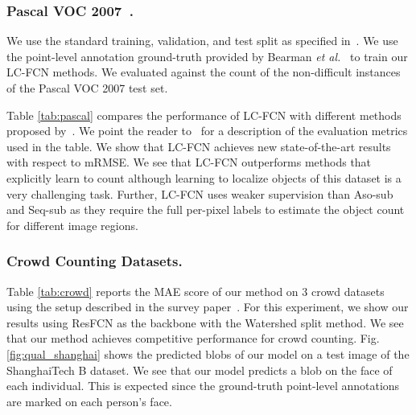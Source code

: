 \documentclass[runningheads]{llncs}
\begin{document}
\vspace{-.6cm}
\subsubsection{Pascal VOC 2007~\cite{everingham2015pascal}.}  We use the standard training, validation, and test split as specified in~\cite{everingham2015pascal}. We use the point-level annotation ground-truth provided by Bearman \emph{et al.}~\cite{bearman2016s} to train our LC-FCN methods. We evaluated against the count of the non-difficult instances of the Pascal VOC 2007 test set.





Table \ref{tab:pascal} compares the performance of LC-FCN with different methods proposed by~\cite{chattopadhyay2016counting}. We point the reader to~\cite{chattopadhyay2016counting} for a description of the evaluation metrics used in the table. We show that LC-FCN achieves new state-of-the-art results with respect to mRMSE. We see that LC-FCN outperforms methods that explicitly learn to count although learning to localize objects of this dataset is a very challenging task. Further, LC-FCN uses weaker supervision than Aso-sub and Seq-sub as they require the full per-pixel labels to estimate the object count for different image regions.



\subsubsection{Crowd Counting Datasets.}
Table \ref{tab:crowd} reports the MAE score of our method on 3 crowd datasets using the setup described in the survey paper~\cite{sindagi2017survey}.  For this experiment, we show our results using ResFCN as the backbone with the Watershed split method. We see that our method achieves competitive performance for crowd counting. 
Fig. \ref{fig:qual_shanghai} shows the predicted blobs of our model on a test image of the ShanghaiTech B dataset. We see that our model predicts a blob on the face of each individual. This is expected since the ground-truth point-level annotations are marked on each person's face. 
\end{document}
